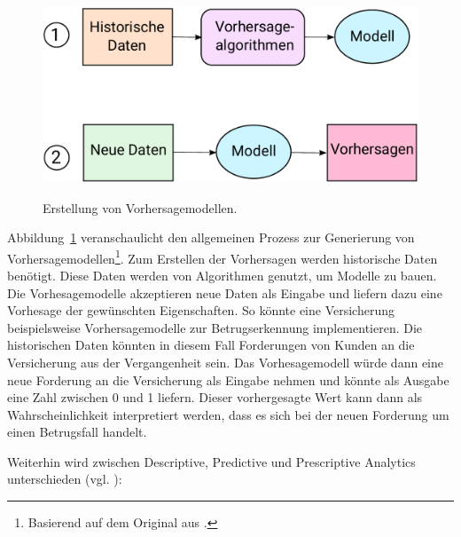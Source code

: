 \begin{figure}%
\centering
\caption{Erstellung von Vorhersagemodellen.}
\includegraphics[scale=0.8]{Grafiken/PA_Ink.pdf} 
\label{pic:PA}
\end{figure}
Abbildung~\ref{pic:PA} veranschaulicht den allgemeinen Prozess zur Generierung
von Vorhersagemodellen\footnote{
Basierend auf dem Original aus \cite{Parthasarathy}.
}.
Zum Erstellen der Vorhersagen werden historische Daten benötigt. Diese Daten
werden von Algorithmen genutzt, um Modelle zu bauen. Die Vorhesagemodelle
akzeptieren neue Daten als Eingabe und liefern dazu eine Vorhesage der
gewünschten Eigenschaften. So könnte eine Versicherung beispielsweise
Vorhersagemodelle zur Betrugserkennung implementieren. Die historischen Daten
könnten in diesem Fall Forderungen von Kunden an die Versicherung aus der
Vergangenheit sein. Das Vorhesagemodell würde dann eine neue Forderung an die
Versicherung als Eingabe nehmen und könnte als Ausgabe eine Zahl zwischen 0 und
1 liefern. Dieser vorhergesagte Wert kann dann als Wahrscheinlichkeit
interpretiert werden, dass es sich bei der neuen Forderung um einen Betrugsfall
handelt. 

Weiterhin wird zwischen Descriptive, Predictive und Prescriptive Analytics
unterschieden (vgl. \cite{Martin}):

